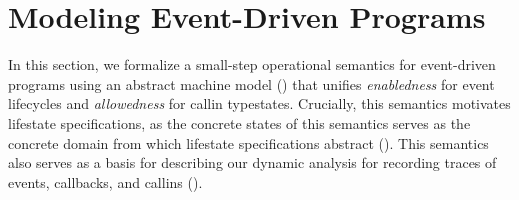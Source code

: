 \documentclass[10pt,reprint,nocopyrightspace,numbers]{sigplanconf}
\begin{document}




\section{Modeling Event-Driven Programs}
\label{sec:concrete}

In this section, we formalize a small-step operational semantics for event-driven programs using an abstract machine model (\semname) that unifies \emph{enabledness} for event lifecycles and \emph{allowedness} for callin typestates.
%
Crucially, this semantics motivates lifestate specifications, as the concrete states of this semantics serves as the concrete domain from which lifestate specifications abstract ().
This semantics also serves as a basis for describing our dynamic analysis for recording traces of events, callbacks, and callins ().
\end{document}
